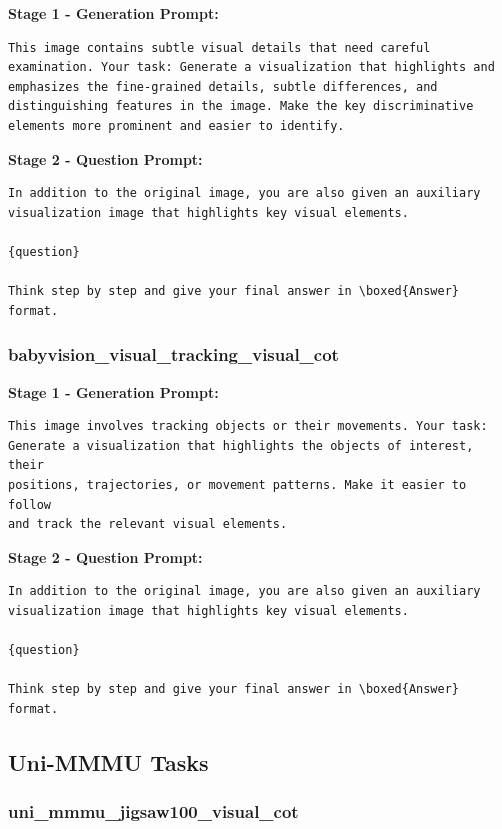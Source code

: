 \documentclass{article}
\theoremstyle{plain}
\theoremstyle{definition}
\theoremstyle{remark}
\begin{document}
\textbf{Stage 1 - Generation Prompt:}

\begin{verbatim}
This image contains subtle visual details that need careful
examination. Your task: Generate a visualization that highlights and
emphasizes the fine-grained details, subtle differences, and
distinguishing features in the image. Make the key discriminative
elements more prominent and easier to identify.
\end{verbatim}

\textbf{Stage 2 - Question Prompt:}

\begin{verbatim}
In addition to the original image, you are also given an auxiliary
visualization image that highlights key visual elements.

{question}

Think step by step and give your final answer in \boxed{Answer} format.
\end{verbatim}

\subsubsection{babyvision\_visual\_tracking\_visual\_cot}

\textbf{Stage 1 - Generation Prompt:}

\begin{verbatim}
This image involves tracking objects or their movements. Your task:
Generate a visualization that highlights the objects of interest, their
positions, trajectories, or movement patterns. Make it easier to follow
and track the relevant visual elements.
\end{verbatim}

\textbf{Stage 2 - Question Prompt:}

\begin{verbatim}
In addition to the original image, you are also given an auxiliary
visualization image that highlights key visual elements.

{question}

Think step by step and give your final answer in \boxed{Answer} format.
\end{verbatim}

\subsection{Uni-MMMU Tasks}

\subsubsection{uni\_mmmu\_jigsaw100\_visual\_cot}
\end{document}
